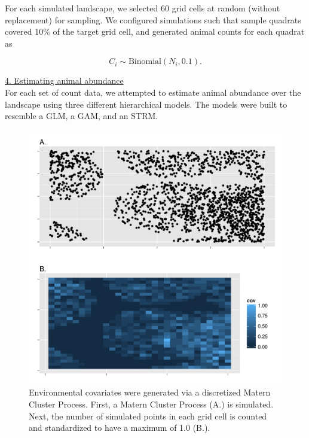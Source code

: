\documentclass[12pt,fleqn]{article}
\begin{document}
\begin{flushleft}
For each simulated landscape, we selected 60 grid cells at random (without replacement) for sampling.  We configured simulations such that sample quadrats covered 10\% of the target grid cell, and generated animal counts for each quadrat as
\begin{linenomath}
\begin{equation*}
  C_i \sim \text{Binomial}(N_i,0.1).
\end{equation*}
\end{linenomath}

\underline{4. Estimating animal abundance} \\

For each set of count data, we attempted to estimate animal abundance over the landscape using three different hierarchical models.  The models were built to resemble a GLM, a GAM, and an STRM.




\renewcommand{\refname}{Literature Cited}




\end{flushleft}

\begin{figure}[!h]
\begin{center}
\includegraphics[width=6in]{MaternCov.pdf}
\end{center}
\caption{Environmental covariates were generated via a discretized Matern Cluster Process.  First, a Matern Cluster Process (A.) is simulated.  Next, the number of simulated points in each grid cell is counted and standardized to have a maximum of 1.0 (B.).}
\label{fig:Matern}
\end{figure}
\end{document}
